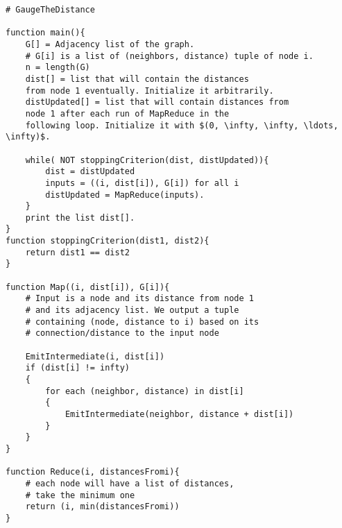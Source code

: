 \documentclass[12 pt]{article}
\begin{document}
	\begin{lstlisting}
# GaugeTheDistance 

function main(){
	G[] = Adjacency list of the graph.
	# G[i] is a list of (neighbors, distance) tuple of node i.
	n = length(G)
	dist[] = list that will contain the distances
	from node 1 eventually. Initialize it arbitrarily.
	distUpdated[] = list that will contain distances from
	node 1 after each run of MapReduce in the
	following loop. Initialize it with $(0, \infty, \infty, \ldots, \infty)$.
	
	while( NOT stoppingCriterion(dist, distUpdated)){
		dist = distUpdated
		inputs = ((i, dist[i]), G[i]) for all i
		distUpdated = MapReduce(inputs).
	}
	print the list dist[].
}
function stoppingCriterion(dist1, dist2){
	return dist1 == dist2
}

function Map((i, dist[i]), G[i]){
	# Input is a node and its distance from node 1
	# and its adjacency list. We output a tuple
	# containing (node, distance to i) based on its
	# connection/distance to the input node
	
	EmitIntermediate(i, dist[i])
	if (dist[i] != infty)
	{
		for each (neighbor, distance) in dist[i]
		{
			EmitIntermediate(neighbor, distance + dist[i])
		}
	}
}

function Reduce(i, distancesFromi){
	# each node will have a list of distances,
	# take the minimum one
	return (i, min(distancesFromi))
}
	\end{lstlisting}
	
	
\end{document}
